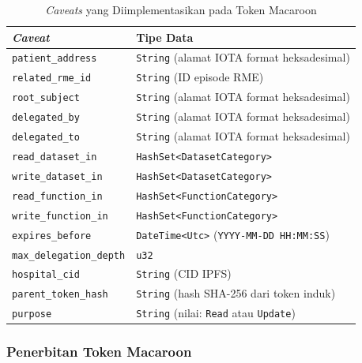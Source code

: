 \documentclass[bahasa, 12pt, a4paper, onecolumn, oneside, final]{report}
\begin{document}
\begin{table}[!ht]
	\centering
	\caption{\textit{Caveats} yang Diimplementasikan pada Token Macaroon}
	\label{tab:implementasi-caveats-macaroons}
	\small
	\begin{tabular}{|p{}|p{}|}
		\hline
		\textbf{\textit{Caveat}}        & \textbf{Tipe Data}
		\\ \hline
		\texttt{patient\_address}       & \texttt{String} (alamat IOTA format heksadesimal)
		\\ \hline
		\texttt{related\_rme\_id}       & \texttt{String} (ID episode RME)
		\\ \hline
		\texttt{root\_subject}          & \texttt{String} (alamat IOTA format heksadesimal)
		\\ \hline
		\texttt{delegated\_by}          & \texttt{String} (alamat IOTA format heksadesimal)
		\\ \hline
		\texttt{delegated\_to}          & \texttt{String} (alamat IOTA format heksadesimal)
		\\ \hline
		\texttt{read\_dataset\_in}      & \texttt{HashSet<DatasetCategory>}
		\\ \hline
		\texttt{write\_dataset\_in}     & \texttt{HashSet<DatasetCategory>}
		\\ \hline
		\texttt{read\_function\_in}     & \texttt{HashSet<FunctionCategory>}
		\\ \hline
		\texttt{write\_function\_in}    & \texttt{HashSet<FunctionCategory>}
		\\ \hline
		\texttt{expires\_before}        & \texttt{DateTime<Utc>} (\texttt{YYYY-MM-DD HH:MM:SS})
		\\ \hline
		\texttt{max\_delegation\_depth} & \texttt{u32}
		\\ \hline
		\texttt{hospital\_cid}          & \texttt{String} (CID IPFS)
		\\ \hline
		\texttt{parent\_token\_hash}    & \texttt{String} (hash SHA-256 dari token induk)
		\\ \hline
		\texttt{purpose}                & \texttt{String} (nilai: \texttt{Read} atau \texttt{Update})
		\\ \hline
	\end{tabular}
\end{table}

\subsubsection{Penerbitan Token Macaroon}
\label{subsubsec:penerbitan-awal-token-macaroons}
\end{document}
